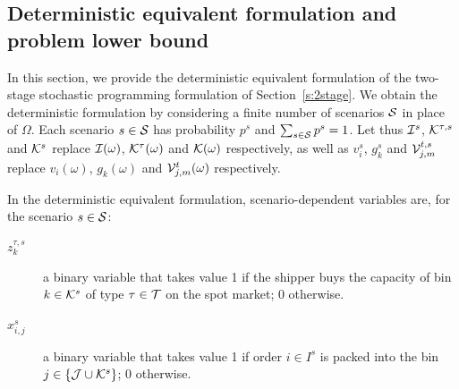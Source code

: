 \documentclass[a4paper,11pt]{article}
\begin{document}
	\subsection{Deterministic equivalent formulation and problem lower bound}\label{s:deteq}
	In this section, we provide the deterministic equivalent formulation of the two-stage stochastic programming formulation of Section~\ref{s:2stage}.
	We obtain the deterministic formulation by considering a finite number of scenarios ${\cal S}$ in place of $ \Omega$.
	Each scenario $s \in {\cal S}$ has probability $p^{s}$ and $\sum_{s \in {\cal S}} p^{s} = 1$. 
	Let thus ${\cal I}^{s}$, ${\cal K}^{\tau,s}$ and ${\cal K}^{s}$ replace ${\cal I}(\omega)$, ${\cal K}^{\tau}(\omega)$ and ${\cal K}(\omega)$ respectively, as well as $v_i^{s}$, $g^{s}_k$ and ${\cal V}_{j,m}^{t,s}$ replace $v_i(\omega)$, $g_k(\omega)$ and ${\cal V}_{j,m}^t(\omega)$ respectively.
	
	In the deterministic equivalent formulation, scenario-dependent variables are, for the scenario $ s \in {\cal S}$: 
	\begin{description}
		\item[$z_k^{\tau,s}$] a binary variable that takes value 1 if the shipper buys the capacity of bin $ k \in {\cal K}^s$ of type $ \tau \in {\cal T}$ on the spot market; 0 otherwise.
		\item[$ x_{i,j}^{s}$] a binary variable that takes value 1 if order $ i \in I^s$ is packed into the bin $ j \in \{{\cal J} \cup {\cal K}^s\}$; 0 otherwise.
	\end{description}	
	
\end{document}
